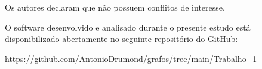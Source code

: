 \documentclass{sbc2023}%
\begin{document}
\begin{interests}
Os autores declaram que não possuem conflitos de interesse.
\end{interests}


\begin{materials}
O software desenvolvido e analisado durante o presente estudo está disponibilizado abertamente no seguinte repositório do GitHub:

\href{https://github.com/AntonioDrumond/grafos/tree/main/Trabalho_1}{https://github.com/AntonioDrumond/grafos/tree/main/Trabalho\_1}
\end{materials}




\end{document}
